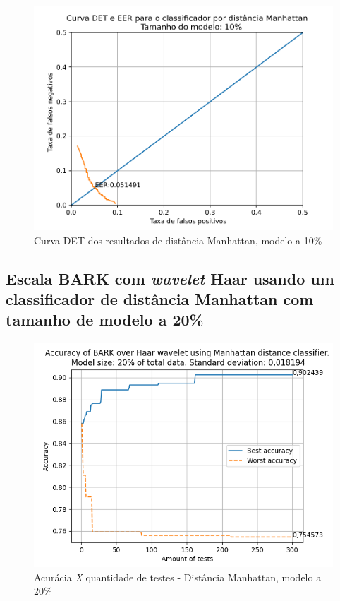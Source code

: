 			\begin{figure}[ht]
				\centering
				\includegraphics[width=\linewidth]{images/results/det/DET_for_classifier_Manhattan_10}
				\caption{Curva DET dos resultados de distância Manhattan, modelo a 10\%}
				\label{fig:detforclassifiermanhattan10}
			\end{figure}
	
			\forceNewPage
		\subsection{Escala BARK com \textit{wavelet} Haar usando um classificador de distância Manhattan com tamanho de modelo a 20\%}
			
			
	
			\begin{figure}[ht]
				\centering
				\includegraphics[width=\linewidth]{images/results/confusionMatrices/classifier_Manhattan_20.png}
				\caption{Acurácia \textit{X} quantidade de testes - Distância Manhattan, modelo a 20\%}
				\label{fig:classifiermanhattan20}
			\end{figure}
		

